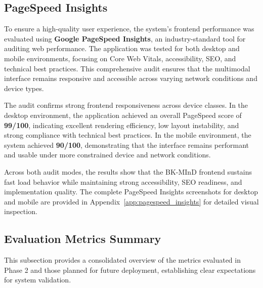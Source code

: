 \subsection{PageSpeed Insights}

To ensure a high-quality user experience, the system's frontend performance was evaluated using \textbf{Google PageSpeed Insights}, an industry-standard tool for auditing web performance. The application was tested for both desktop and mobile environments, focusing on Core Web Vitals, accessibility, SEO, and technical best practices. This comprehensive audit ensures that the multimodal interface remains responsive and accessible across varying network conditions and device types.

The audit confirms strong frontend responsiveness across device classes. In the desktop environment, the application achieved an overall PageSpeed score of \textbf{99/100}, indicating excellent rendering efficiency, low layout instability, and strong compliance with technical best practices. In the mobile environment, the system achieved \textbf{90/100}, demonstrating that the interface remains performant and usable under more constrained device and network conditions.

Across both audit modes, the results show that the BK-MInD frontend sustains fast load behavior while maintaining strong accessibility, SEO readiness, and implementation quality. The complete PageSpeed Insights screenshots for desktop and mobile are provided in Appendix~\ref{app:pagespeed_insights} for detailed visual inspection.

\subsection{Evaluation Metrics Summary}

This subsection provides a consolidated overview of the metrics evaluated in Phase 2 and those planned for future deployment, establishing clear expectations for system validation.

